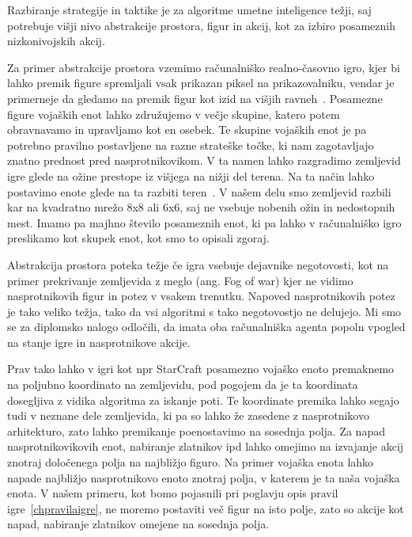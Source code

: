 \documentclass[a4paper, 12pt]{book}
\begin{document}
Razbiranje strategije in taktike je za algoritme umetne inteligence težji, saj potrebuje višji nivo abstrakcije prostora, figur in akcij, kot za izbiro posameznih nizkonivojskih akcij.

Za primer abstrakcije prostora vzemimo računalniško realno-časovno igro, kjer bi lahko premik figure spremljali vsak prikazan piksel na prikazovalniku, vendar je primerneje da gledamo na premik figur kot izid na višjih ravneh~\cite{uriarte2015automatic}.
Posamezne figure vojaških enot lahko združujemo v večje skupine, katero potem obravnavamo in upravljamo kot en osebek.
Te skupine vojaških enot je pa potrebno pravilno postavljene na razne strateške točke, ki nam zagotavljajo znatno prednost pred nasprotnikovikom.
V ta namen lahko razgradimo zemljevid igre glede na ožine prestope iz višjega na nižji del terena.
Na ta način lahko postavimo enote glede na ta razbiti teren~\cite{uriarte2014game}.
V našem delu smo zemljevid razbili kar na kvadratno mrežo 8x8 ali 6x6, saj ne vsebuje nobenih ožin in nedostopnih mest.
Imamo pa majhno število posameznih enot, ki pa lahko v računalniško igro preslikamo kot skupek enot, kot smo to opisali zgoraj.

Abstrakcija prostora poteka težje če igra vsebuje dejavnike negotovosti, kot na primer prekrivanje zemljevida z meglo (ang. Fog of war) kjer ne vidimo nasprotnikovih figur in potez v vsakem trenutku. 
Napoved nasprotnikovih potez je tako veliko težja, tako da vsi algoritmi s tako negotovostjo ne delujejo.
Mi smo se za diplomsko nalogo odločili, da imata oba računalniška agenta popoln vpogled na stanje igre in nasprotnikove akcije.

Prav tako lahko v igri kot npr StarCraft posamezno vojaško enoto premaknemo na poljubno koordinato na zemljevidu, pod pogojem da je ta koordinata dosegljiva z vidika algoritma za iskanje poti.
Te koordinate premika lahko segajo tudi v neznane dele zemljevida, ki pa so lahko že zasedene z nasprotnikovo arhitekturo, zato lahko premikanje poenostavimo na sosednja polja.
Za napad nasprotnikovikovih enot, nabiranje zlatnikov ipd lahko omejimo na izvajanje akcij znotraj določenega polja na najbližjo figuro.
Na primer vojaška enota lahko napade najbližjo nasprotnikovo enoto znotraj polja, v katerem je ta naša vojaška enota.
V našem primeru, kot bomo pojasnili pri poglavju opis pravil igre~\ref{chpravilaigre}, ne moremo postaviti več figur na isto polje, zato so akcije kot napad, nabiranje zlatnikov omejene na sosednja polja.

\end{document}
